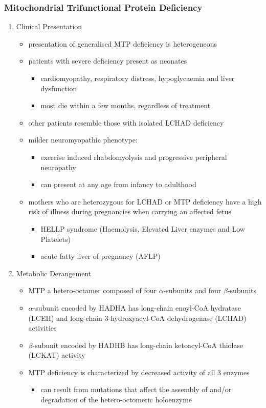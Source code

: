 \documentclass[12pt]{scrartcl}
\begin{document}
\subsubsection{Mitochondrial Trifunctional Protein Deficiency}
\label{sec:orgd196fee}
\begin{enumerate}
\item Clinical Presentation
\label{sec:orgd6984c2}
\begin{itemize}
\item presentation of generalised MTP deficiency is heterogeneous
\item patients with severe deficiency present as neonates
\begin{itemize}
\item cardiomyopathy, respiratory distress, hypoglycaemia and liver dysfunction
\item most die within a few months, regardless of treatment
\end{itemize}
\item other patients resemble those with isolated LCHAD deficiency
\item milder neuromyopathic phenotype:
\begin{itemize}
\item exercise induced rhabdomyolysis and progressive peripheral
neuropathy
\item can present at any age from infancy to adulthood
\end{itemize}
\item mothers who are heterozygous for LCHAD or MTP deficiency have a high
risk of illness during pregnancies when carrying an affected fetus
\begin{itemize}
\item HELLP syndrome (Haemolysis, Elevated Liver enzymes and Low Platelets)
\item acute fatty liver of pregnancy (AFLP)
\end{itemize}
\end{itemize}
\item Metabolic Derangement
\label{sec:orga691e19}
\begin{itemize}
\item MTP a hetero-octamer composed of four \(\alpha\)-subunits and four
\(\beta\)-subunits
\item \(\alpha\)-subunit encoded by HADHA has long-chain enoyl-CoA hydratase
(LCEH) and long-chain 3-hydroxyacyl-CoA dehydrogenase (LCHAD)
activities
\item \(\beta\)-subunit encoded by HADHB has long-chain ketoacyl-CoA thiolase
(LCKAT) activity
\item MTP deficiency is characterized by decreased activity of all 3 enzymes
\begin{itemize}
\item can result from mutations that affect the assembly of and/or
degradation of the hetero-octomeric holoenzyme
\end{itemize}
\end{itemize}


\end{enumerate}
\end{document}
